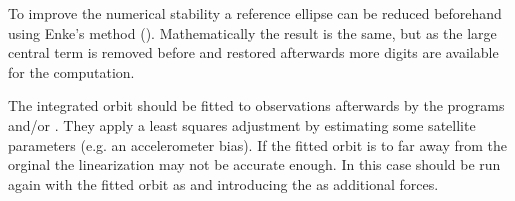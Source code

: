 To improve the numerical stability a reference ellipse can be reduced beforehand using Enke's method ().
Mathematically the result is the same, but as the large central term is removed before and restored
afterwards more digits are available for the computation.

The integrated orbit should be fitted to observations afterwards by the programs
 and/or .
They apply a least squares adjustment by estimating some satellite parameters (e.g. an accelerometer bias).
If the fitted orbit is to far away from the orginal  the linearization may not be
accurate enough. In this case  should be run again with the fitted orbit
as  and introducing the  as additional forces.


